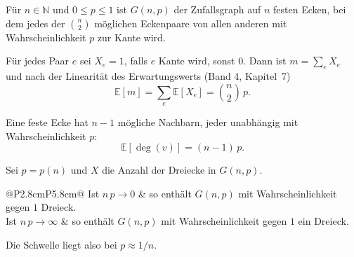 \begin{definition}
Für $n \in \mathbb{N}$ und $0 \le p \le 1$ ist $G(n,p)$ der Zufallsgraph auf $n$ festen Ecken, bei dem jedes der $\binom{n}{2}$ möglichen Eckenpaare  von allen anderen mit Wahrscheinlichkeit $p$ zur Kante wird.
\end{definition}

\begin{merksatz}
Für jedes Paar $e$ sei $X_e = 1$, falls $e$ Kante wird, sonst $0$. Dann ist $m = \sum_e X_e$ und nach der Linearität des Erwartungswerts (Band 4, Kapitel~7)
\[ \mathbb{E}[m] = \sum_{e} \mathbb{E}[X_e] = \binom{n}{2}\,p . \]

Eine feste Ecke hat $n-1$ mögliche Nachbarn, jeder unabhängig mit Wahrscheinlichkeit $p$:
\[ \mathbb{E}[\deg(v)] = (n-1)\,p . \]

\begin{center}
\begin{minipage}{0.88\textwidth}
\end{minipage}
\end{center}
\end{merksatz}

\begin{merksatz}
Sei $p = p(n)$ und $X$ die Anzahl der Dreiecke in $G(n,p)$.
\begin{center}
\renewcommand{\arraystretch}{1.5}
\begin{tabular}{@{}P{2.8cm}P{5.8cm}@{}}
\toprule
Ist $n\,p \to 0$ & so enthält $G(n,p)$ mit Wahrscheinlichkeit gegen $1$  Dreieck.\\
Ist $n\,p \to \infty$ & so enthält $G(n,p)$ mit Wahrscheinlichkeit gegen $1$ ein Dreieck.\\
\bottomrule
\end{tabular}
\end{center}
Die Schwelle liegt also bei $p \approx 1/n$.
\end{merksatz}

